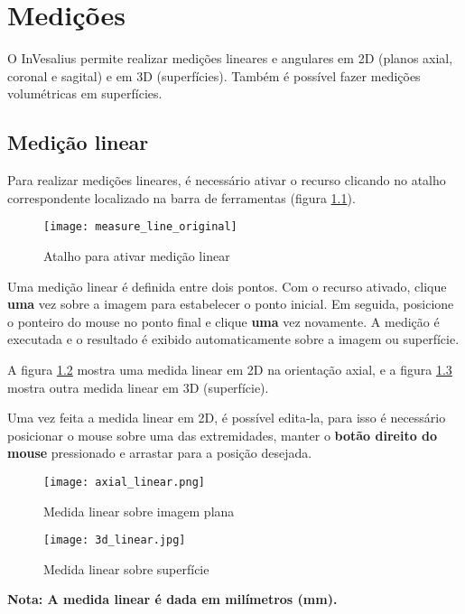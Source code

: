 \chapter{Medições}

O InVesalius permite realizar medições lineares e angulares em 2D (planos axial,
coronal e sagital) e em 3D (superfícies). Também é possível fazer medições
volumétricas em superfícies.

\section{Medição linear}

Para realizar medições lineares, é necessário ativar o recurso clicando no atalho
correspondente localizado na barra de ferramentas (figura \ref{fig:measure_line_original}).

\begin{figure}[!htb]
\centering
\texttt{[image: measure\_line\_original]}
\caption{Atalho para ativar medição linear}
\label{fig:measure_line_original}
\end{figure}

Uma medição linear é definida entre dois pontos. Com o recurso ativado, clique
\textbf{uma} vez sobre a imagem para estabelecer o ponto inicial. Em seguida,
posicione o ponteiro do mouse no ponto final e clique \textbf{uma} vez novamente.
A medição é executada e o resultado é exibido automaticamente sobre a imagem ou
superfície.

A figura \ref{fig:axial_linear} mostra uma medida linear em 2D na orientação axial,
e a figura \ref{fig:3d_linear} mostra outra medida linear em 3D (superfície).

Uma vez feita a medida linear em 2D, é possível edita-la, para isso é necessário posicionar o mouse sobre uma das extremidades, manter o \textbf{botão direito do mouse} pressionado e arrastar para a posição desejada.

\begin{figure}[!htb]
\centering
\texttt{[image: axial\_linear.png]}
\caption{Medida linear sobre imagem plana}
\label{fig:axial_linear}
\end{figure}

\begin{figure}[!htb]
\centering
\texttt{[image: 3d\_linear.jpg]}
\caption{Medida linear sobre superfície}
\label{fig:3d_linear}
\end{figure}

\textbf{Nota: A medida linear é dada em milímetros (mm).}

